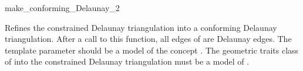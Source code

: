 \begin{ccRefFunction}{make_conforming_Delaunay_2}


{ Refines the constrained Delaunay triangulation  into a
  conforming Delaunay triangulation. After a call to this function,
  all edges of  are Delaunay edges.   
  \ccRequire The template parameter  should be a model of the
  concept .
  The geometric traits class of into the constrained Delaunay
  triangulation must be a model of
  .} 

\end{ccRefFunction}

